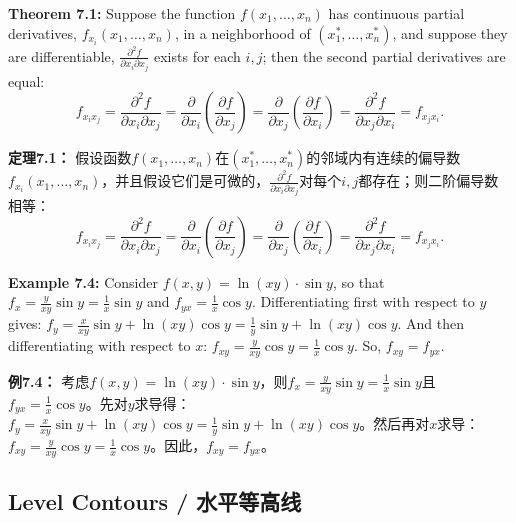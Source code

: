 \begin{original}
\textbf{Theorem 7.1:} Suppose the function $f(x_1, \dots, x_n)$ has continuous partial derivatives, $f_{x_i}(x_1, \dots, x_n)$, in a neighborhood of $(x_1^*, \dots, x_n^*)$, and suppose they are differentiable, $\frac{\partial^2 f}{\partial x_i \partial x_j}$ exists for each $i, j$; then the second partial derivatives are equal:
\[
f_{x_i x_j} = \frac{\partial^2 f}{\partial x_i \partial x_j} = \frac{\partial}{\partial x_i}\left(\frac{\partial f}{\partial x_j}\right) = \frac{\partial}{\partial x_j}\left(\frac{\partial f}{\partial x_i}\right) = \frac{\partial^2 f}{\partial x_j \partial x_i} = f_{x_j x_i}.
\]
\end{original}
\begin{translation}
\textbf{定理7.1：} 假设函数$f(x_1, \dots, x_n)$在$(x_1^*, \dots, x_n^*)$的邻域内有连续的偏导数$f_{x_i}(x_1, \dots, x_n)$，并且假设它们是可微的，$\frac{\partial^2 f}{\partial x_i \partial x_j}$对每个$i, j$都存在；则二阶偏导数相等：
\[
f_{x_i x_j} = \frac{\partial^2 f}{\partial x_i \partial x_j} = \frac{\partial}{\partial x_i}\left(\frac{\partial f}{\partial x_j}\right) = \frac{\partial}{\partial x_j}\left(\frac{\partial f}{\partial x_i}\right) = \frac{\partial^2 f}{\partial x_j \partial x_i} = f_{x_j x_i}.
\]
\end{translation}

\begin{original}
\textbf{Example 7.4:} Consider $f(x, y) = \ln(x y) \cdot \sin y$, so that $f_x = \frac{y}{x y} \sin y = \frac{1}{x} \sin y$ and $f_{yx} = \frac{1}{x} \cos y$. Differentiating first with respect to $y$ gives: $f_y = \frac{x}{x y} \sin y + \ln(x y) \cos y = \frac{1}{y} \sin y + \ln(x y) \cos y$. And then differentiating with respect to $x$: $f_{xy} = \frac{y}{x y} \cos y = \frac{1}{x} \cos y$. So, $f_{xy} = f_{yx}$.
\end{original}
\begin{translation}
\textbf{例7.4：} 考虑$f(x, y) = \ln(x y) \cdot \sin y$，则$f_x = \frac{y}{x y} \sin y = \frac{1}{x} \sin y$且$f_{yx} = \frac{1}{x} \cos y$。先对$y$求导得：$f_y = \frac{x}{x y} \sin y + \ln(x y) \cos y = \frac{1}{y} \sin y + \ln(x y) \cos y$。然后再对$x$求导：$f_{xy} = \frac{y}{x y} \cos y = \frac{1}{x} \cos y$。因此，$f_{xy} = f_{yx}$。
\end{translation}

\subsection{Level Contours / 水平等高线}


